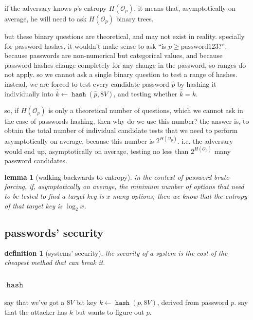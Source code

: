 \documentclass[twocolumn]{article}
\newtheorem{definition}{definition}
\newtheorem{lemma}{lemma}
\DeclareMathOperator{\hash}{\mathtt{hash}}
\begin{document}
if the adversary knows $p$'s entropy $H(\mathcal{O}_p)$, it means that,
asymptotically on average, he will need to ask $H(\mathcal{O}_p)$ binary
trees.

but these binary questions are theoretical, and may not exist in reality.
specially for password hashes, it wouldn't make sense to ask ``is $p \ge
\text{password123}$?'', because passwords are non-numerical but
categorical values, and because password hashes change completely for any
change in the password, so ranges do not apply.  so we cannot ask a single
binary question to test a range of hashes.  instead, we are forced to test
every candidate password $\hat p$ by hashing it individually into $\hat k
\gets \hash(\hat p, 8V)$, and testing whether $\hat k = k$.

so, if $H(\mathcal{O}_p)$ is only a theoretical number of questions, which
we cannot ask in the case of passwords hashing, then why do we use this
number?  the answer is, to obtain the total number of individual candidate
tests that we need to perform asymptotically on average, because this
number is $2^{H(\mathcal{O}_p)}$.   i.e. the adversary would end up,
asymptotically on average, testing no less than $2^{H(\mathcal{O}_p)}$ many
password candidates.

\begin{lemma}[walking backwards to
entropy]\label{theorem_back_to_entropy}
    in the context of password brute-forcing, if, asymptotically on
    average, the minimum number of options that need to be tested to find a
    target key is $x$ many options, then we know that the entropy of that
    target key is $\log_2 x$.
\end{lemma}

\subsection{passwords' security}
\begin{definition}[systems' security]\label{def_system_security}
the security of a system is the cost of the cheapest method that can break
it.
\end{definition}

\subsubsection{$\hash$}
say that we've got a $8V$ bit key $k \gets \hash(p, 8V)$, derived from
password $p$.  say that the attacker has $k$ but wants to figure out $p$.
\end{document}
